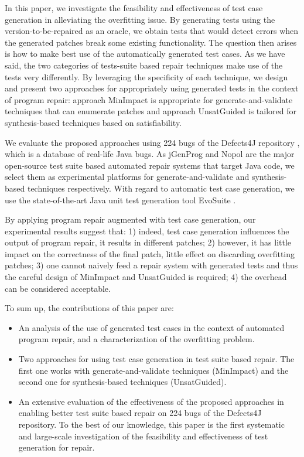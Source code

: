 \documentclass[]{sig-alternate}
\begin{document}
In this paper, we investigate the feasibility and effectiveness of test case generation in alleviating the overfitting issue. By generating tests using the version-to-be-repaired as an oracle, we obtain tests that would detect errors when the generated patches break some existing functionality. 
The question then arises is how to make best use of the automatically generated test cases.
As we have said, the two categories of tests-suite based repair techniques make use of the tests very differently. By leveraging the specificity of each technique, we design and present two approaches for appropriately using generated tests in the context of program repair: approach MinImpact is appropriate for generate-and-validate techniques that can enumerate patches and approach UnsatGuided is tailored for synthesis-based techniques based on satisfiability.

We evaluate the proposed approaches using 224 bugs of the Defects4J repository \cite{JustJE2014}, which is a database of real-life Java bugs. As jGenProg \cite{astor2016} and Nopol \cite{nopol} are the major open-source test suite based automated repair systems that target Java code, we select them as experimental platforms for generate-and-validate and synthesis-based techniques respectively. With regard to automatic test case generation, we use the state-of-the-art Java unit test generation tool EvoSuite \cite{evosuite}.

By applying program repair augmented with test case generation, our experimental results suggest that:
1) indeed, test case generation influences the output of program repair, it results in different patches;
2) however, it has little impact on the correctness of the final patch, little effect on discarding overfitting patches;
3) one cannot naively feed a repair system with generated tests and thus the careful design of MinImpact and UnsatGuided is required;
4) the overhead can be considered acceptable.

To sum up, the contributions of this paper are: 

\begin{itemize}

\item An analysis of the use of generated test cases in the context of automated program repair, and a characterization of the overfitting problem.

\item Two approaches for using test case generation in test suite based repair. The first one works with generate-and-validate techniques (MinImpact) and the second one for synthesis-based techniques (UnsatGuided).  

\item An extensive evaluation of the effectiveness of the proposed approaches in enabling better test suite based repair on 224 bugs of the Defects4J repository. To the best of our knowledge, this paper is the first systematic and large-scale investigation of the feasibility and effectiveness of test generation for repair.


\end{itemize}
\end{document}
